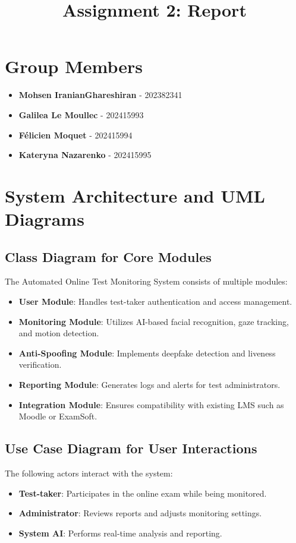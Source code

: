 \documentclass[12pt,a4paper]{article}
\title{\textbf{Assignment 2: Report}}
\author{}
\date{}
\begin{document}
\maketitle

\section*{Group Members}
\vspace{-5pt}
\begin{itemize}
    \item \textbf{Mohsen IranianGhareshiran} - 202382341
    \item \textbf{Galilea Le Moullec} - 202415993
    \item \textbf{Félicien Moquet} - 202415994
    \item \textbf{Kateryna Nazarenko} - 202415995
\end{itemize}


\section{System Architecture and UML Diagrams}

\subsection{Class Diagram for Core Modules}
The Automated Online Test Monitoring System consists of multiple modules:
\begin{itemize}
\item \textbf{User Module}: Handles test-taker authentication and access management.
\item \textbf{Monitoring Module}: Utilizes AI-based facial recognition, gaze tracking, and motion detection.
\item \textbf{Anti-Spoofing Module}: Implements deepfake detection and liveness verification.
\item \textbf{Reporting Module}: Generates logs and alerts for test administrators.
\item \textbf{Integration Module}: Ensures compatibility with existing LMS such as Moodle or ExamSoft.
\end{itemize}

\subsection{Use Case Diagram for User Interactions}
The following actors interact with the system:
\begin{itemize}
\item \textbf{Test-taker}: Participates in the online exam while being monitored.
\item \textbf{Administrator}: Reviews reports and adjusts monitoring settings.
\item \textbf{System AI}: Performs real-time analysis and reporting.
\end{itemize}
\end{document}
